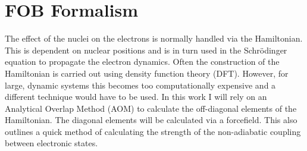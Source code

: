 
\chapter{FOB Formalism}
\label{chap:FOB}
The effect of the nuclei on the electrons is normally handled via the Hamiltonian. This is dependent on nuclear positions and is in turn used in the Schr\"odinger equation to propagate the electron dynamics. Often the construction of the Hamiltonian is carried out using density function theory (DFT). However, for large, dynamic systems this becomes too computationally expensive and a different technique would have to be used. In this work I will rely on an Analytical Overlap Method (AOM) \cite{gajdos_ultrafast_2014} to calculate the off-diagonal elements of the Hamiltonian. The diagonal elements will be calculated via a forcefield. This also outlines a quick method of calculating the strength of the non-adiabatic coupling between electronic states.

